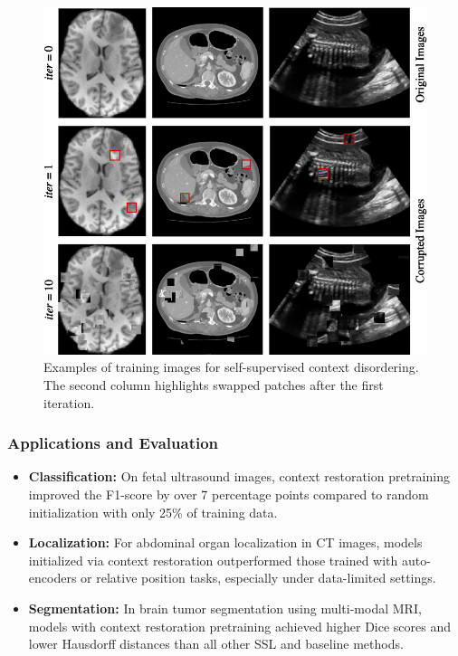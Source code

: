 \documentclass{article}
\begin{document}
\begin{figure}[H]
    \centering
    \includegraphics[width=0.98\linewidth]{images/Generating_training_images_for_self_supervised_context_disordering.pdf}
    \caption{Examples of training images for self-supervised context disordering. The second column highlights swapped patches after the first iteration.}
    \label{fig:context_disordering}
\end{figure}



\subsubsection{Applications and Evaluation}
\begin{itemize}
    \item \textbf{Classification:} On fetal ultrasound images, context restoration pretraining improved the F1-score by over 7 percentage points compared to random initialization with only 25\% of training data​.
    \item \textbf{Localization:} For abdominal organ localization in CT images, models initialized via context restoration outperformed those trained with auto-encoders or relative position tasks, especially under data-limited settings​.
    \item \textbf{Segmentation:} In brain tumor segmentation using multi-modal MRI, models with context restoration pretraining achieved higher Dice scores and lower Hausdorff distances than all other SSL and baseline methods​.
\end{itemize}
\end{document}
